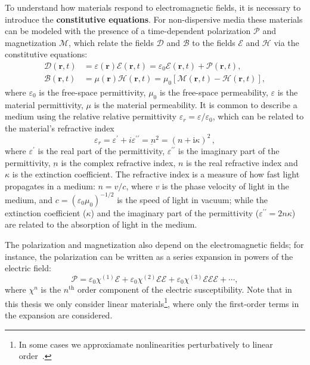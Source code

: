 To understand how materials respond to electromagnetic fields, it is necessary to introduce the \textbf{constitutive equations}.
 For non-dispersive media these materials can be
modeled
with the presence of a time-dependent polarization $\bm{\mathcal{P}}$ and
magnetization $\bm{\mathcal{M}}$,
which relate the fields $\bm{\mathcal{D}}$ and $\bm{\mathcal{B}}$ to the fields
$\bm{\mathcal{E}}$ and
$\bm{\mathcal{H}}$ via the constitutive equations:
\begin{align}
    \bm{\mathcal{D}}(\mathbf{r}, t) & = \varepsilon(\mathbf{r}) \bm{\mathcal{E}}(\mathbf{r}, t) =
    \varepsilon_0 \bm{\mathcal{E}}(\mathbf{r}, t) + \bm{\mathcal{P}}(\mathbf{r}, t),
    \label{eq:D}                                                                \\
    \bm{\mathcal{B}}(\mathbf{r}, t) & =  \mu(\mathbf{r}) \bm{\mathcal{H}}(\mathbf{r},
    t) = \mu_0 \left[ \bm{\mathcal{M}}(\mathbf{r},
    t) - \bm{\mathcal{H}}(\mathbf{r}, t)\right] \label{eq:H},
\end{align}
where $\varepsilon_0$ is the free-space permittivity, $\mu_0$ is the free-space
permeability, $\varepsilon$ is the material permittivity, 
$\mu$ is the material permeability. It is common to describe a medium
using the relative relative permittivity $\varepsilon_r=\varepsilon/\varepsilon_0$, which can be related to the material's refractive index~\cite{wooten}
\begin{equation}\label{eq:perm}
    \varepsilon_r = \varepsilon^\prime +
i\varepsilon^{\prime\prime} = \underbar{n}^2 = (n+\text{i}\kappa)^2\,,
\end{equation}
where $\varepsilon^\prime$ is the real part of the permittivity, $\varepsilon^{\prime\prime}$ is the imaginary part of the permittivity, $\underbar{n}$ is the complex refractive index, 
$n$ is the real refractive index and $\kappa$ is the extinction coefficient. 
The refractive index is a measure of how fast light propagates in a medium: $n=v/c$, where $v$ is the phase velocity of light in the medium, and 
$c=(\varepsilon_0 \mu_0)^{-1/2}$ is the speed of light in vacuum; while the extinction
coefficient ($\kappa$) and the imaginary part of the permittivity ($\varepsilon^{\prime\prime}=2n\kappa$) are related to the absorption of light in the medium.

The polarization and magnetization also depend on the electromagnetic
fields; for instance, the
polarization can be written as a series expansion in powers of the electric
field:
\begin{equation}\label{eq:polarization}
\bm{\mathcal{P}}=\mathcal{\varepsilon}_0 \bm{\mathcal{\chi}}^{(1)}
    \bm{\mathcal{E}}+\mathcal{\varepsilon}_0 \bm{\mathcal{\chi}}^{(2)}
    \bm{\mathcal{E}} \bm{\mathcal{E}}+\mathcal{\varepsilon}_0
    \bm{\mathcal{\chi}}^{(3)} \bm{\mathcal{E}} \bm{\mathcal{E}}
    \bm{\mathcal{E}}+\cdots,
\end{equation}
where $\bm{\mathcal{\chi}}^{n}$ is the $n^\text{th}$ order component of the
electric susceptibility. Note that in this thesis
we only consider linear materials\footnote{In some cases we approxiamate nonlinearities perturbatively to linear
order~\cite{ownpub4}.}, where only the first-order terms in the expansion are
considered. \\


